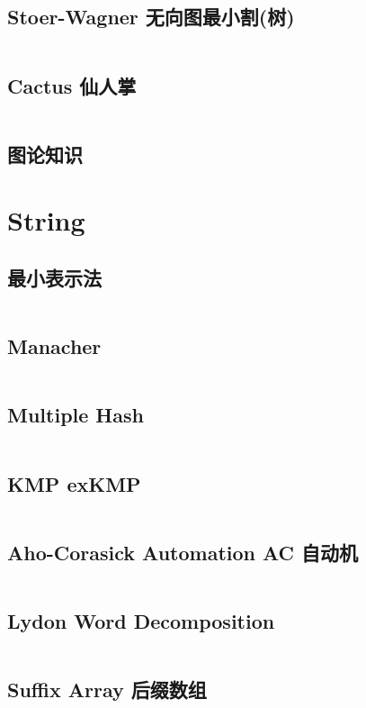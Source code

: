 \documentclass[titlepage, a4paper]{article}
\begin{document}
\begin{multicols}{2}
\begin{spacing}{0.6}
				\subsection{Stoer-Wagner 无向图最小割(树)}
				\inputminted{cpp}{src/TreeandGraph/无向图最小割.cpp}
				\subsection{Cactus 仙人掌}
				\inputminted{cpp}{src/TreeandGraph/cactus.cpp}
				\subsection{图论知识}
				
			
			\section{String}
				\subsection{最小表示法}
				\inputminted{cpp}{src/String/最小表示法.cpp}
				\subsection{Manacher}
				\inputminted{cpp}{src/String/Manacher.cpp}
				\subsection{Multiple Hash}
				\inputminted{cpp}{src/String/hash.cpp}	
				\subsection{KMP exKMP}
				\inputminted{cpp}{src/String/KMP.cpp}
				\subsection{Aho-Corasick Automation AC 自动机}
				\inputminted{cpp}{src/String/AC 自动机.cpp}
				\subsection{Lydon Word Decomposition}
				\inputminted{cpp}{src/String/Lyndon Word.cpp}
				\subsection{Suffix Array 后缀数组}
				\inputminted{cpp}{src/String/SA.cpp}

\end{spacing}
\end{multicols}
\end{document}
